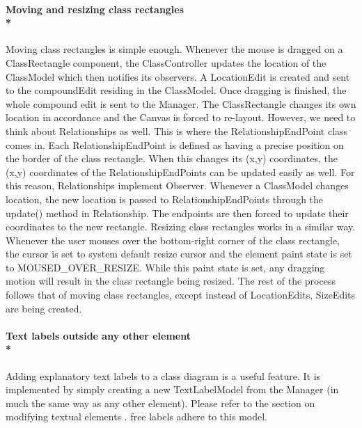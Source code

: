 \paragraph{\small{\tab Moving and resizing class rectangles\\*}}

\hspace{-10pt}Moving class rectangles is simple enough. Whenever the mouse is dragged on a ClassRectangle component, the ClassController updates the location of the ClassModel which then notifies its observers. A LocationEdit is created and sent to the compoundEdit residing in the ClassModel. Once dragging is finished, the whole compound edit is sent to the Manager. The ClassRectangle changes its own location in accordance and the Canvas is forced to re-layout. However, we need to think about Relationships as well. This is where the RelationshipEndPoint class comes in. Each RelationshipEndPoint is defined as having a precise position on the border of the class rectangle. When this changes its (x,y) coordinates, the (x,y) coordinates of the RelationshipEndPoints can be updated easily as well. For this reason, Relationships implement Observer. Whenever a ClassModel changes location, the new location is passed to RelationshipEndPoints through the update() method in Relationship. The endpoints are then forced to update their coordinates to the new rectangle.  
Resizing class rectangles works in a similar way. Whenever the user mouses over the bottom-right corner of the class rectangle, the cursor is set to system default resize cursor and the element paint state is set to MOUSED\_OVER\_RESIZE. While this paint state is set, any dragging motion will result in the class rectangle being resized.  The rest of the process follows that of moving class rectangles, except instead of LocationEdits, SizeEdits are being created. 

\paragraph{\small{\tab Text labels outside any other element\\*}}

\hspace{-10pt}Adding explanatory text labels to a class diagram is a useful feature. It is implemented by simply creating a new TextLabelModel from the Manager (in much the same way as any other element). Please refer to the section on modifying textual elements . free labels adhere to this model. 

